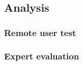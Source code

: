 






\subsection{Analysis}

\subsubsection{Remote user test}


\subsubsection{Expert evaluation}


\cleardoublepage